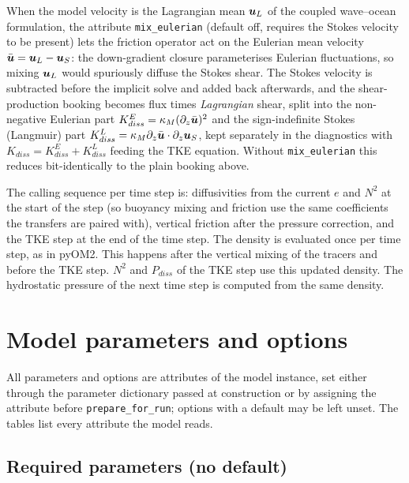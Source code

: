 \documentclass[12pt]{article}
\renewcommand{\v}[1]{{\mbox{\boldmath$ #1 $}}}  %
\newcommand{\pz}[1]{{\partial_z #1}}
\begin{document}
When the model velocity is the Lagrangian mean $\v u_L$ of the coupled
wave--ocean formulation, the attribute \verb|mix_eulerian| (default off,
requires the Stokes velocity to be present) lets the friction operator act
on the Eulerian mean velocity $\bar{\v u} = \v u_L - \v u_S$: the
down-gradient closure parameterises Eulerian fluctuations, so mixing
$\v u_L$ would spuriously diffuse the Stokes shear. The Stokes velocity is
subtracted before the implicit solve and added back afterwards, and the
shear-production booking becomes flux times \emph{Lagrangian} shear, split
into the non-negative Eulerian part $K_{diss}^E = \kappa_M (\pz{\bar{\v u}})^2$
and the sign-indefinite Stokes (Langmuir) part
$K_{diss}^L = \kappa_M \pz{\bar{\v u}} \cdot \pz{\v u_S}$, kept separately
in the diagnostics with $K_{diss} = K_{diss}^E + K_{diss}^L$ feeding the TKE
equation. Without \verb|mix_eulerian| this reduces bit-identically to the
plain booking above.

The calling sequence per time step is: diffusivities from the current
$e$ and $N^2$ at the start of the step (so buoyancy mixing and friction
use the same coefficients the transfers are paired with), vertical
friction after the pressure correction, and the TKE step at the end of
the time step.
The density is evaluated once per time step, as in pyOM2.
This happens after the vertical mixing of the tracers and before the TKE step.
$N^2$ and $P_{diss}$ of the TKE step use this updated density.
The hydrostatic pressure of the next time step is computed from the same density.


\section*{Model parameters and options}

All parameters and options are attributes of the model instance, set either
through the parameter dictionary passed at construction or by assigning the
attribute before \verb|prepare_for_run|; options with a default may be left
unset. The tables list every attribute the model reads.

\subsection*{Required parameters (no default)}
\end{document}
